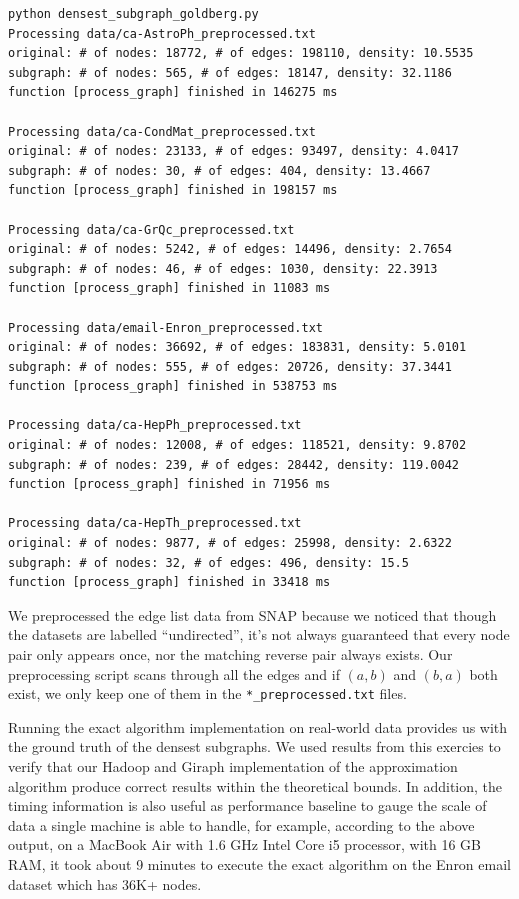 \documentclass{article}
\begin{document}
\begin{lstlisting}[mathescape=true]
python densest_subgraph_goldberg.py
Processing data/ca-AstroPh_preprocessed.txt
original: # of nodes: 18772, # of edges: 198110, density: 10.5535
subgraph: # of nodes: 565, # of edges: 18147, density: 32.1186
function [process_graph] finished in 146275 ms

Processing data/ca-CondMat_preprocessed.txt
original: # of nodes: 23133, # of edges: 93497, density: 4.0417
subgraph: # of nodes: 30, # of edges: 404, density: 13.4667
function [process_graph] finished in 198157 ms

Processing data/ca-GrQc_preprocessed.txt
original: # of nodes: 5242, # of edges: 14496, density: 2.7654
subgraph: # of nodes: 46, # of edges: 1030, density: 22.3913
function [process_graph] finished in 11083 ms

Processing data/email-Enron_preprocessed.txt
original: # of nodes: 36692, # of edges: 183831, density: 5.0101
subgraph: # of nodes: 555, # of edges: 20726, density: 37.3441
function [process_graph] finished in 538753 ms

Processing data/ca-HepPh_preprocessed.txt
original: # of nodes: 12008, # of edges: 118521, density: 9.8702
subgraph: # of nodes: 239, # of edges: 28442, density: 119.0042
function [process_graph] finished in 71956 ms

Processing data/ca-HepTh_preprocessed.txt
original: # of nodes: 9877, # of edges: 25998, density: 2.6322
subgraph: # of nodes: 32, # of edges: 496, density: 15.5
function [process_graph] finished in 33418 ms
\end{lstlisting}

We preprocessed the edge list data from SNAP because we noticed that though the datasets are labelled ``undirected'', it's not always guaranteed that every node pair only appears once, nor the matching reverse pair always exists. Our preprocessing script scans through all the edges and if $(a, b)$ and $(b, a)$ both exist, we only keep one of them in the \texttt{*\_preprocessed.txt} files.

Running the exact algorithm implementation on real-world data provides us with the ground truth of the densest subgraphs. We used results from this exercies to verify that our Hadoop and Giraph implementation of the approximation algorithm produce correct results within the theoretical bounds. In addition, the timing information is also useful as performance baseline to gauge the scale of data a single machine is able to handle, for example, according to the above output, on a MacBook Air with 1.6 GHz Intel Core i5 processor, with 16 GB RAM, it took about 9 minutes to execute the exact algorithm on the Enron email dataset which has 36K+ nodes.
\end{document}
